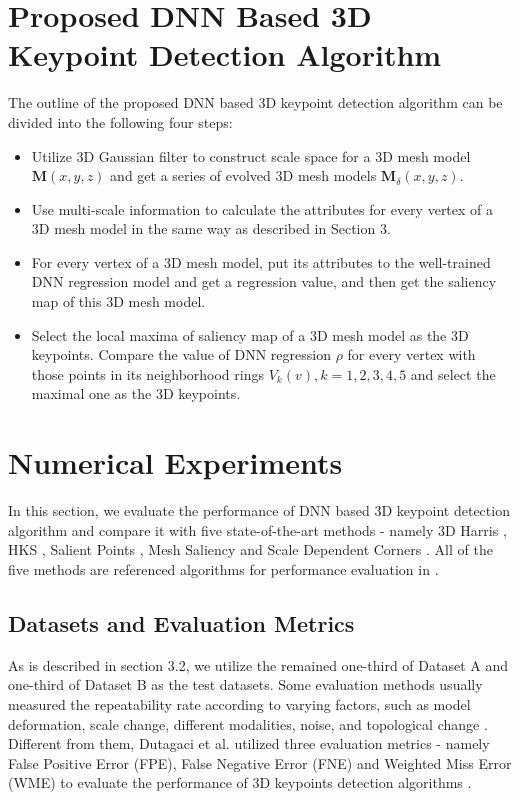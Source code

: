 \documentclass[runningheads]{article}
\begin{document}
\section{Proposed DNN Based 3D Keypoint Detection Algorithm}
The outline of the proposed DNN based 3D keypoint detection algorithm can be divided into the following four steps:
\begin{itemize}
	\item Utilize 3D Gaussian filter to construct scale space for a 3D mesh model \emph{$\bm{M}(x,y,z)$} and get a series of evolved 3D mesh models \emph{$\bm{M}_\delta(x,y,z)$}.
	\item Use multi-scale information to calculate the attributes for every vertex of a 3D mesh model in the same way as described in Section 3.
	\item For every vertex of a 3D mesh model, put its attributes to the well-trained DNN regression model and get a regression value, and then get the saliency map of this 3D mesh model.
	\item Select the local maxima of saliency map of a 3D mesh model as the 3D keypoints. Compare the value of DNN regression \emph{$\rho$}  for every vertex with those points in its neighborhood rings \emph{$V_k(v),k=1,2,3,4,5$} and select the maximal one as the 3D keypoints.
\end{itemize}


\section{Numerical Experiments}

In this section, we evaluate the performance of DNN based 3D keypoint detection algorithm and compare it with five state-of-the-art methods - namely 3D Harris \cite{3Dharris2011harris}, HKS \cite{sun2009concise}, Salient Points \cite{castellani2008sparse}, Mesh Saliency \cite{Meshsaliency2005mesh} and Scale Dependent Corners \cite{novatnack2007scale}. All of the five methods are referenced algorithms for performance evaluation in \cite{song20133d,randomforest20143d,dutagaci2012evaluation}.

\subsection{Datasets and Evaluation Metrics}

As is described in section 3.2, we utilize the remained one-third of Dataset A and one-third of Dataset B as the test datasets. Some evaluation methods usually measured the repeatability rate according to varying factors, such as model deformation, scale change, different modalities, noise, and topological change \cite{tombari2013performance}. Different from them, Dutagaci et al. utilized three evaluation metrics - namely False Positive Error (FPE), False Negative Error (FNE) and Weighted Miss Error (WME) to evaluate the performance of 3D keypoints detection algorithms \cite{dutagaci2012evaluation}.
\end{document}
